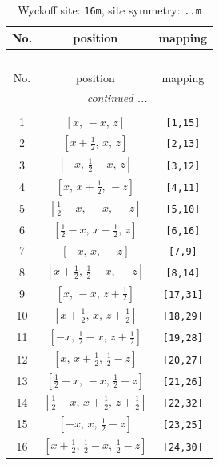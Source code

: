 \documentclass[fleqn,8pt]{jsarticle}
\begin{document}
\renewcommand{\arraystretch}{1.2}
\begin{longtable}{ccc}
\caption{Wyckoff site: {\tt 16m}, site symmetry: {\tt ..m}}
 \\
 \hline \hline
No. & position & mapping \\ \hline \endfirsthead

\multicolumn{2}{l}{\tablename\ \thetable{}} \\
 \hline \hline
No. & position & mapping \\ \hline \endhead

 \hline \hline
\multicolumn{2}{r}{\footnotesize\it continued ...} \\ \endfoot

 \hline \hline
\multicolumn{2}{r}{} \\ \endlastfoot

1 & $\left[ x,\, - x,\, z \right]$ & {\tt [1,15]} \\ \hline
2 & $\left[ x + \frac{1}{2},\, x,\, z \right]$ & {\tt [2,13]} \\ \hline
3 & $\left[ - x,\, \frac{1}{2} - x,\, z \right]$ & {\tt [3,12]} \\ \hline
4 & $\left[ x,\, x + \frac{1}{2},\, - z \right]$ & {\tt [4,11]} \\ \hline
5 & $\left[ \frac{1}{2} - x,\, - x,\, - z \right]$ & {\tt [5,10]} \\ \hline
6 & $\left[ \frac{1}{2} - x,\, x + \frac{1}{2},\, z \right]$ & {\tt [6,16]} \\ \hline
7 & $\left[ - x,\, x,\, - z \right]$ & {\tt [7,9]} \\ \hline
8 & $\left[ x + \frac{1}{2},\, \frac{1}{2} - x,\, - z \right]$ & {\tt [8,14]} \\ \hline
9 & $\left[ x,\, - x,\, z + \frac{1}{2} \right]$ & {\tt [17,31]} \\ \hline
10 & $\left[ x + \frac{1}{2},\, x,\, z + \frac{1}{2} \right]$ & {\tt [18,29]} \\ \hline
11 & $\left[ - x,\, \frac{1}{2} - x,\, z + \frac{1}{2} \right]$ & {\tt [19,28]} \\ \hline
12 & $\left[ x,\, x + \frac{1}{2},\, \frac{1}{2} - z \right]$ & {\tt [20,27]} \\ \hline
13 & $\left[ \frac{1}{2} - x,\, - x,\, \frac{1}{2} - z \right]$ & {\tt [21,26]} \\ \hline
14 & $\left[ \frac{1}{2} - x,\, x + \frac{1}{2},\, z + \frac{1}{2} \right]$ & {\tt [22,32]} \\ \hline
15 & $\left[ - x,\, x,\, \frac{1}{2} - z \right]$ & {\tt [23,25]} \\ \hline
16 & $\left[ x + \frac{1}{2},\, \frac{1}{2} - x,\, \frac{1}{2} - z \right]$ & {\tt [24,30]} \\
\end{longtable}
\end{document}
